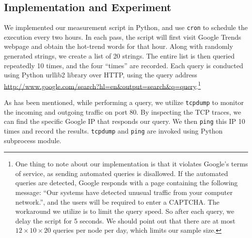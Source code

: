 

\subsection{Implementation and Experiment}
\label{sec:impl-exper}

We implemented our measurement script in Python, and use \texttt{cron} to schedule the execution every two hours. In each pass, the script will first visit Google Trends webpage and obtain the hot-trend words for that hour. Along with randomly generated strings, we create a list of 20 strings. The entire list is then queried repeatedly 10 times, and the four ``times'' are recorded. Each query is conducted using Python urllib2 library over HTTP, using the query address \url{http://www.google.com/search?hl=en\&output=search\&q=query}.\footnote{One thing to note about our implementation is that it violates Google's terms of service, as sending automated queries is disallowed. If the automated queries are detected, Google responds with a page containing the following message: ``Our systems have detected unusual traffic from your computer network.'', and the users will be required to enter a CAPTCHA. The workaround we utilize is to limit the query speed. So after each query, we delay the script for 5 seconds. We should point out that there are at most $12\times10\times20$ queries per node per day, which limits our sample size.}

As has been mentioned, while performing a query, we utilize \texttt{tcpdump} to monitor the incoming and outgoing traffic on port 80. By inspecting the TCP traces, we can find the specific Google IP that responds our query. We then \texttt{ping} this IP 10 times and record the results. \texttt{tcpdump} and \texttt{ping} are invoked using Python subprocess module.

